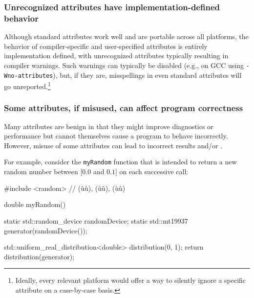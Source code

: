 \subsubsection[Unrecognized attributes have implementation-defined behavior]{Unrecognized attributes have implementation-defined behavior}\label{unrecognized-attributes-have-implementation-defined-behavior}

Although standard attributes work well and are portable across all
platforms, the behavior of compiler-specific and user-specified
attributes is entirely implementation defined, with unrecognized
attributes typically resulting in compiler warnings. Such warnings can typically be disabled (e.g., on GCC using
\lstinline!-Wno-attributes!), but, if they are, misspellings in even standard
attributes will go unreported.{\cprotect\footnote{Ideally, every relevant platform would offer a way to silently ignore a specific
  attribute on a case-by-case basis.}}

\subsubsection[Some attributes, if misused, can affect program correctness]{Some attributes, if misused, can affect program correctness}\label{some-attributes,-if-misused,-can-affect-program-correctness}

Many attributes are benign in that they might improve diagnostics or
performance but cannot themselves cause a program to behave incorrectly.
However, misuse of some attributes can lead to incorrect
results and/or .

For example, consider the \lstinline!myRandom! function that is intended to
return a new random number between $[0.0$ and $0.1]$ on each successive
call:
\begin{emcppshiddenlisting}[emcppsbatch=e12]
#include <random>  // (ù{}ù), (ù{}ù), (ù{}ù)
\end{emcppshiddenlisting}
\begin{emcppslisting}[emcppsbatch=e12]
double myRandom()
{
    static std::random_device randomDevice;
    static std::mt19937 generator(randomDevice());

    std::uniform_real_distribution<double> distribution(0, 1);
    return distribution(generator);
}
\end{emcppslisting}

